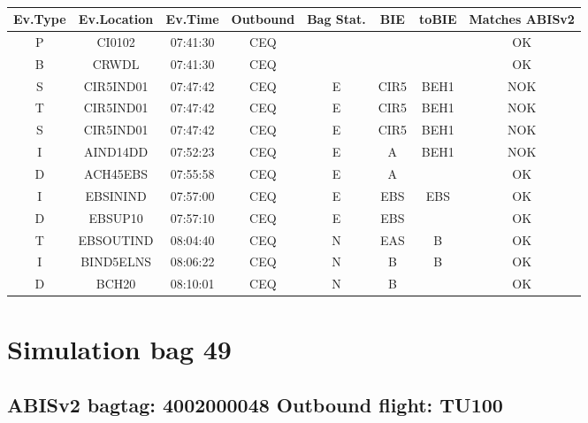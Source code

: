 \documentclass{report}
\begin{document}
\paragraph{}
\begin{longtable}{cccccccc}    \toprule
\rowcolor{white!50}
\textbf{Ev.Type} & \textbf{Ev.Location} & \textbf{Ev.Time} & \textbf{Outbound} & \textbf{Bag Stat.} & \textbf{BIE} & \textbf{toBIE} & \textbf{Matches ABISv2} \\\midrule
P & CI0102 & 07:41:30  & CEQ &  &  &  & OK\\
B & CRWDL & 07:41:30  & CEQ &  &  &  & OK\\
S & CIR5IND01 & 07:47:42  & CEQ & E & CIR5 & BEH1 & NOK\\
T & CIR5IND01 & 07:47:42  & CEQ & E & CIR5 & BEH1 & NOK\\
S & CIR5IND01 & 07:47:42  & CEQ & E & CIR5 & BEH1 & NOK\\
I & AIND14DD & 07:52:23  & CEQ & E & A & BEH1 & NOK\\
D & ACH45EBS & 07:55:58  & CEQ & E & A &  & OK\\
I & EBSININD & 07:57:00  & CEQ & E & EBS & EBS & OK\\
D & EBSUP10 & 07:57:10  & CEQ & E & EBS &  & OK\\
T & EBSOUTIND & 08:04:40  & CEQ & N & EAS & B & OK\\
I & BIND5ELNS & 08:06:22  & CEQ & N & B & B & OK\\
D & BCH20 & 08:10:01  & CEQ & N & B &  & OK\\
\bottomrule
\end{longtable}
\pagebreak
\section*{Simulation bag 49}
\subsection*{ABISv2 bagtag: 4002000048 Outbound flight: TU100}
\end{document}
